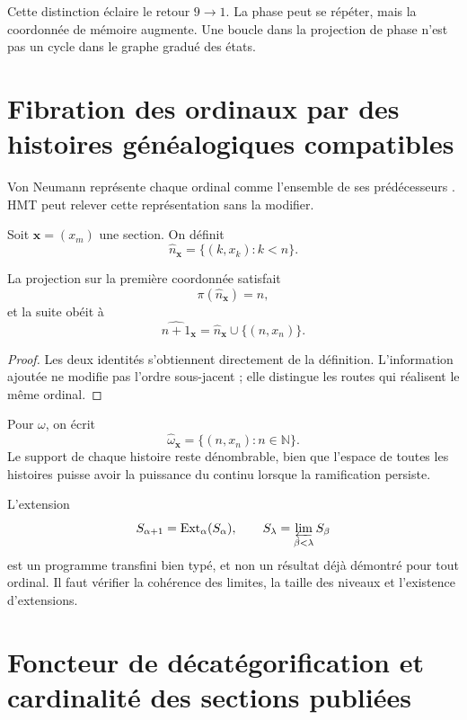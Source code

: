 Cette distinction éclaire le retour \(9\to1\). La phase peut se répéter, mais
la coordonnée de mémoire augmente. Une boucle dans la projection de phase n'est pas un
cycle dans le graphe gradué des états.

\section{Fibration des ordinaux par des histoires généalogiques compatibles}

Von Neumann représente chaque ordinal comme l'ensemble de ses prédécesseurs
\citep{vonneumann1923}. HMT peut relever cette représentation sans la modifier.

\begin{definition}
Soit \(\boldsymbol x=(x_m)\) une section. On définit
\[
  \widehat n_{\boldsymbol x}
  =
  \{(k,x_k):k<n\}.
\]
\end{definition}

\begin{proposition}
La projection sur la première coordonnée satisfait
\[
  \pi(\widehat n_{\boldsymbol x})=n,
\]
et la suite obéit à
\[
  \widehat{n+1}_{\boldsymbol x}
  =
  \widehat n_{\boldsymbol x}\cup\{(n,x_n)\}.
\]
\end{proposition}

\begin{proof}
Les deux identités s'obtiennent directement de la définition. L'information
ajoutée ne modifie pas l'ordre sous-jacent ; elle distingue les routes qui réalisent le
même ordinal.
\end{proof}

Pour \(\omega\), on écrit
\[
  \widehat\omega_{\boldsymbol x}
  =
  \{(n,x_n):n\in\mathbb N\}.
\]
Le support de chaque histoire reste dénombrable, bien que l'espace de
toutes les histoires puisse avoir la puissance du continu lorsque la ramification
persiste.

\begin{remark}
L'extension
\[
S_{\alpha+1}=\operatorname{Ext}_\alpha(S_\alpha),
\qquad
S_\lambda=\varprojlim_{\beta<\lambda}S_\beta
\]
est un programme transfini bien typé, et non un résultat déjà démontré pour
tout ordinal. Il faut vérifier la cohérence des limites, la taille des
niveaux et l'existence d'extensions.
\end{remark}

\section{Foncteur de décatégorification et cardinalité des sections publiées}

